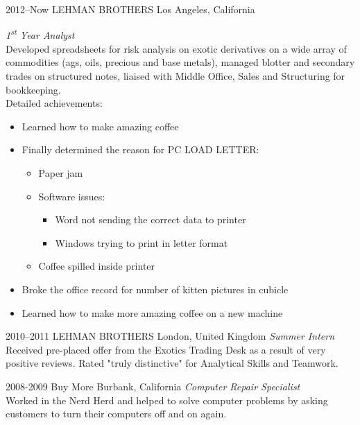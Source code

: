 \documentclass{structure}
\begin{document}
\begin{entrylist}



    \entry
    {2012--Now}
    {LEHMAN BROTHERS}
    {Los Angeles, California}
    {\emph{1\textsuperscript{st} Year Analyst} \\
        Developed spreadsheets for risk analysis on exotic derivatives on a wide array of commodities (ags, oils, precious and base metals), managed blotter and secondary trades on structured notes, liaised with Middle Office, Sales and Structuring for bookkeeping. \\
        Detailed achievements:
        \begin{itemize}
            \item Learned how to make amazing coffee
            \item Finally determined the reason for \textsc{PC LOAD LETTER}:
                  \begin{itemize}
                      \item Paper jam
                      \item Software issues:
                            \begin{itemize}
                                \item Word not sending the correct data to printer
                                \item Windows trying to print in letter format
                            \end{itemize}
                      \item Coffee spilled inside printer
                  \end{itemize}
            \item Broke the office record for number of kitten pictures in cubicle
            \item Learned how to make more amazing coffee on a new machine
        \end{itemize}
    }


    \entry
    {2010--2011}
    {LEHMAN BROTHERS}
    {London, United Kingdom}
    {\emph{Summer Intern} \\
        Received pre-placed offer from the Exotics Trading Desk as a result of very positive reviews. Rated "truly distinctive" for Analytical Skills and Teamwork.
    }


    \entry
    {2008-2009}
    {Buy More}
    {Burbank, California}
    {\emph{Computer Repair Specialist} \\
        Worked in the Nerd Herd and helped to solve computer problems by asking customers to turn their computers off and on again.
    }


\end{entrylist}
\end{document}
